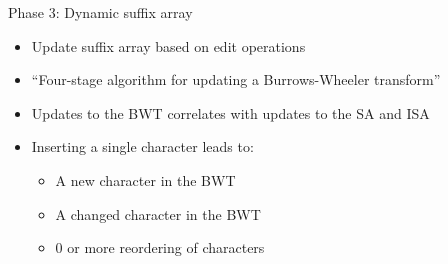 \documentclass[aspectratio=1610, xcolor=table]{beamer}
\begin{document}
\begin{frame}{Phase 3: Dynamic suffix array}
    \begin{itemize}
        \item Update suffix array based on edit operations
        \item ``Four-stage algorithm for updating a Burrows-Wheeler transform''
        \item Updates to the BWT correlates with updates to the SA and ISA
        \item Inserting a single character leads to:
            \begin{itemize}
                \item A new character in the BWT
                \item A changed character in the BWT
                \item 0 or more reordering of characters
            \end{itemize}
    \end{itemize}
\end{frame}
\end{document}
